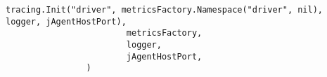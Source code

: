 \documentclass[12pt,a4paper]{report}
\begin{document}
\begin{lstlisting}
tracing.Init("driver", metricsFactory.Namespace("driver", nil), 
logger, jAgentHostPort),
                        metricsFactory,
                        logger,
                        jAgentHostPort,
                )
\end{lstlisting}
\end{document}
